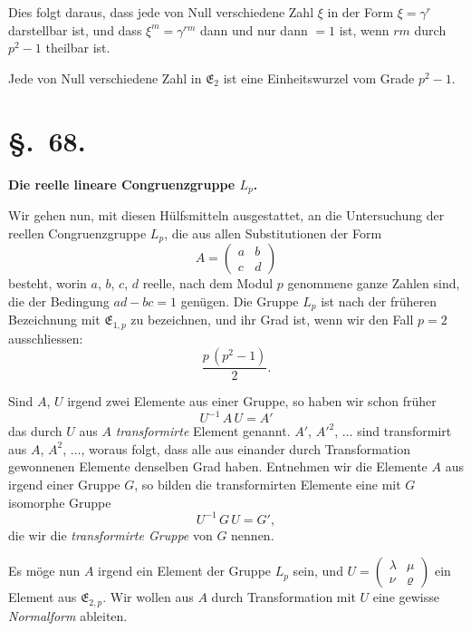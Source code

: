 \documentclass[12pt,a4paper]{article}
\newcommand{\sect}[1]{\section*{{\S.~#1.}}\addcontentsline{toc}{section}{\S.~#1}}
\begin{document}
Dies folgt daraus, dass jede von Null verschiedene Zahl $\xi$ in der Form $\xi = \gamma^{r}$ darstellbar ist, und dass $\xi^{m} = \gamma^{rm}$ dann und nur dann $= 1$ ist, wenn $rm$ durch $p^{2} - 1$ theilbar ist.

Jede von Null verschiedene Zahl in $\mathfrak{E}_{2}$ ist eine Einheitswurzel vom Grade $p^{2} - 1$.

\newpage
\sect{68}
\begin{center}
\textbf{Die reelle lineare Congruenzgruppe $L_{p}$.}
\end{center}
\label{sec:68}

Wir gehen nun, mit diesen Hülfsmitteln ausgestattet, an die Untersuchung der reellen Congruenzgruppe $L_{p}$, die aus allen Substitutionen der Form
\[
A = \begin{pmatrix}a&b\\c&d\end{pmatrix}
\]
besteht, worin $a$, $b$, $c$, $d$ reelle, nach dem Modul $p$ genommene ganze Zahlen sind, die der Bedingung $ad - bc = 1$ genügen. Die Gruppe $L_{p}$ ist nach der früheren Bezeichnung mit $\mathfrak{E}_{1,p}$ zu bezeichnen, und ihr Grad ist, wenn wir den Fall $p = 2$ ausschliessen:
\[
\frac{p\,(p^{2} - 1)}{2}.
\]

Sind $A$, $U$ irgend zwei Elemente aus einer Gruppe, so haben wir schon früher
\[
U^{-1}\,A\,U = A'
\]
das durch $U$ aus $A$ \emph{transformirte} Element genannt. $A'$, $A'^{2}$, $\ldots$ sind transformirt aus $A$, $A^{2}$, $\ldots$, woraus folgt, dass alle aus einander durch Transformation gewonnenen Elemente denselben Grad haben. Entnehmen wir die Elemente $A$ aus irgend einer Gruppe $G$, so bilden die transformirten Elemente eine mit $G$ isomorphe Gruppe
\[
U^{-1}\,G\,U = G',
\]
die wir die \emph{transformirte Gruppe} von $G$ nennen.

Es möge nun $A$ irgend ein Element der Gruppe $L_{p}$ sein, und $U = \begin{pmatrix}\lambda&\mu\\\nu&\varrho\end{pmatrix}$ ein Element aus $\mathfrak{E}_{2,p}$. Wir wollen aus $A$ durch Transformation mit $U$ eine gewisse \emph{Normalform} ableiten.
\end{document}
